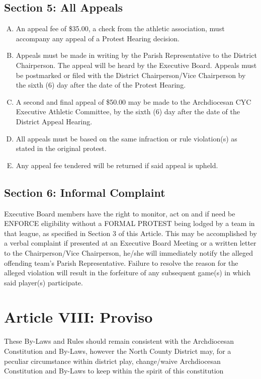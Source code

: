 \documentclass[draft]{memoir}
\begin{document}
\subsection{Section 5: All Appeals}
\begin{enumerate}[A.]
    \item An appeal fee of \$35.00, a check from the athletic association, must accompany any appeal of a Protest Hearing decision.
    \item Appeals must be made in writing by the Parish Representative to the District Chairperson.  The appeal will be  heard by the Executive Board.  Appeals must be postmarked or filed with the District Chairperson/Vice Chairperson by the sixth (6) day after the date of the Protest Hearing.
    \item A second and final appeal of \$50.00 may be made to the Archdiocesan CYC Executive Athletic Committee, by the sixth (6) day after the date of the District Appeal Hearing.
    \item All appeals must be based on the same infraction or rule violation(s) as stated in the original protest.
    \item Any appeal fee tendered will be returned if said appeal is upheld.
\end{enumerate}

\subsection{Section 6: Informal Complaint}
Executive Board members have the right to monitor, act on and if need be ENFORCE eligibility without a FORMAL PROTEST being lodged by a team in that league, as specified in Section 3 of this Article.  This may be accomplished by a verbal complaint if presented at an Executive Board Meeting or a written letter to the Chairperson/Vice Chairperson, he/she will immediately notify the alleged offending team's Parish Representative.  Failure to resolve the reason for the alleged violation will result in the forfeiture of any subsequent game(s) in which said player(s) participate.

\section{Article VIII: Proviso}
These By-Laws and Rules should remain consistent with the Archdiocesan Constitution and By-Laws, however the North County District may, for a peculiar circumstance within district play, change/waive Archdiocesan Constitution and By-Laws to keep within the spirit of this constitution
\end{document}
